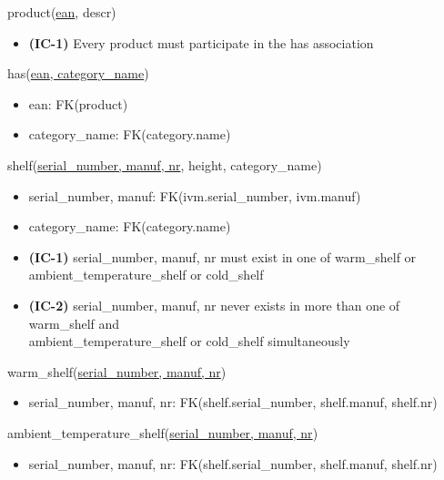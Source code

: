 \documentclass[12pt,a4paper]{article}
\begin{document}
  \noindent
  product(\underline{ean}, descr)
  \begin{itemize}
    \item \textsf{\textbf{(IC-1)} Every} product \textsf{must participate in the} has \textsf{association}
  \end{itemize}

  \vspace*{10pt}
  
  \noindent
  has(\underline{ean, category\_name})
  \begin{itemize}[nosep]
    \item ean: FK(product)
    \item category\_name: FK(category.name)
  \end{itemize}
  
  
  \vspace*{10pt}
  
  \noindent
  shelf(\underline{serial\_number, manuf, nr}, height, category\_name)
  \begin{itemize}[nosep]
    \item serial\_number, manuf: FK(ivm.serial\_number, ivm.manuf)
    \item category\_name: FK(category.name)
    \item \textsf{\textbf{(IC-1)}} serial\_number, manuf, nr \textsf{must exist in one of} warm\_shelf \textsf{or}\\ ambient\_temperature\_shelf \textsf{or} cold\_shelf
    \item \textsf{\textbf{(IC-2)}} serial\_number, manuf, nr \textsf{never exists in more than one of} warm\_shelf \textsf{and}\\ ambient\_temperature\_shelf \textsf{or} cold\_shelf \textsf{simultaneously}
  \end{itemize}
  
  \vspace*{10pt}
  
  \noindent
  warm\_shelf(\underline{serial\_number, manuf, nr})
  \begin{itemize}[nosep]
    \item serial\_number, manuf, nr: FK(shelf.serial\_number, shelf.manuf, shelf.nr)
  \end{itemize}
  
  \vspace*{10pt}
  
  \noindent
  ambient\_temperature\_shelf(\underline{serial\_number, manuf, nr})
  \begin{itemize}[nosep]
    \item serial\_number, manuf, nr: FK(shelf.serial\_number, shelf.manuf, shelf.nr)
  \end{itemize}
  
\end{document}
